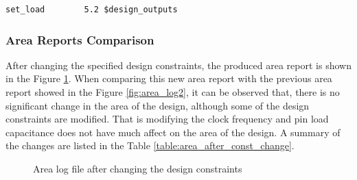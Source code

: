 \documentclass[a4paper,11pt]{article}%
\begin{document}
\begin{Verbatim}[frame=single]
set_load        5.2 $design_outputs
\end{Verbatim}

\subsubsection{Area Reports Comparison}

After changing the specified design constraints, the produced area report is shown in the Figure \ref{fig:area_log3}. When comparing this new area report  with the previous area report showed in the Figure \ref{fig:area_log2}, it can be observed that, there is no significant change in the area of the design, although some of the design constraints are modified. That is modifying the clock frequency and pin load capacitance does not have much affect on the area of the design. A summary of the changes are listed in the Table \ref{table:area_after_const_change}.

\begin{figure}[h]
	\centering
	\caption{Area log file after changing the design constraints}
	\label{fig:area_log3}
\end{figure}
\end{document}
